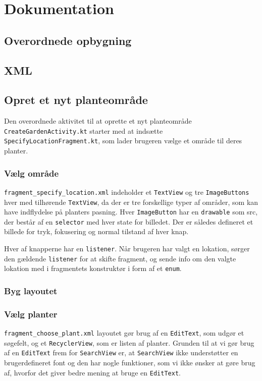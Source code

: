 \newpage
\section{Dokumentation}

\subsection{Overordnede opbygning}

\subsection{XML}

\subsection{Opret et nyt planteområde}
Den overordnede aktivitet til at oprette et nyt planteområde \texttt{CreateGardenActivity.kt} starter med at indsætte \texttt{SpecifyLocationFragment.kt}, som lader brugeren vælge et område til deres planter.

\subsubsection{Vælg område}
\texttt{fragment\_specify\_location.xml} indeholder et \texttt{TextView} og tre \texttt{ImageButtons} hver med tilhørende \texttt{TextView}, da der er tre forskellige typer af områder, som kan have indflydelse på planters pasning. Hver \texttt{ImageButton} har en \texttt{drawable} som src, der består af en \texttt{selector} med hver state for billedet. Der er således defineret et billede for tryk, fokusering og normal tilstand af hver knap.

Hver af knapperne har en \texttt{listener}. Når brugeren har valgt en lokation, sørger den gældende \texttt{listener} for at skifte fragment, og sende info om den valgte lokation med i fragmentets konstruktør i form af et \texttt{enum}.

\subsubsection{Byg layoutet}

\subsubsection{Vælg planter}

\texttt{fragment\_choose\_plant.xml} layoutet gør brug af en \texttt{EditText}, som udgør et søgefelt, og et \texttt{RecyclerView}, som er listen af planter.
Grunden til at vi gør brug af en \texttt{EditText} frem for \texttt{SearchView} er, at \texttt{SearchView} ikke understøtter en brugerdefineret font og den har nogle funktioner, som vi ikke ønsker at gøre brug af, hvorfor det giver bedre mening at bruge en \texttt{EditText}.

